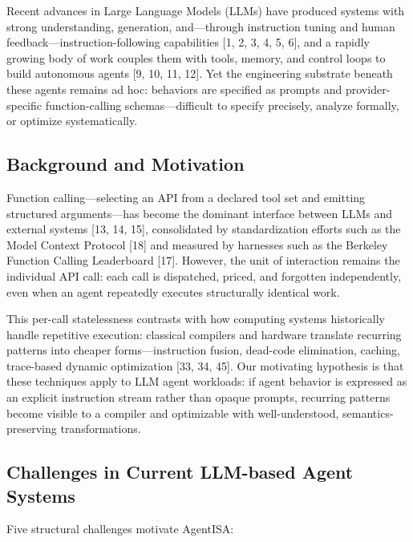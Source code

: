 \documentclass[
  sigconf,
  anonymous]{acmart}
\begin{document}
Recent advances in Large Language Models (LLMs) have produced systems
with strong understanding, generation, and---through instruction tuning
and human feedback---instruction-following capabilities {[}1, 2, 3, 4,
5, 6{]}, and a rapidly growing body of work couples them with tools,
memory, and control loops to build autonomous agents {[}9, 10, 11,
12{]}. Yet the engineering substrate beneath these agents remains ad
hoc: behaviors are specified as prompts and provider-specific
function-calling schemas---difficult to specify precisely, analyze
formally, or optimize systematically.

\subsection{Background and Motivation}\label{background-and-motivation}

Function calling---selecting an API from a declared tool set and
emitting structured arguments---has become the dominant interface
between LLMs and external systems {[}13, 14, 15{]}, consolidated by
standardization efforts such as the Model Context Protocol {[}18{]} and
measured by harnesses such as the Berkeley Function Calling Leaderboard
{[}17{]}. However, the unit of interaction remains the individual API
call: each call is dispatched, priced, and forgotten independently, even
when an agent repeatedly executes structurally identical work.

This per-call statelessness contrasts with how computing systems
historically handle repetitive execution: classical compilers and
hardware translate recurring patterns into cheaper forms---instruction
fusion, dead-code elimination, caching, trace-based dynamic optimization
{[}33, 34, 45{]}. Our motivating hypothesis is that these techniques
apply to LLM agent workloads: if agent behavior is expressed as an
explicit instruction stream rather than opaque prompts, recurring
patterns become visible to a compiler and optimizable with
well-understood, semantics-preserving transformations.

\subsection{Challenges in Current LLM-based Agent
Systems}\label{challenges-in-current-llm-based-agent-systems}

Five structural challenges motivate AgentISA:
\end{document}
